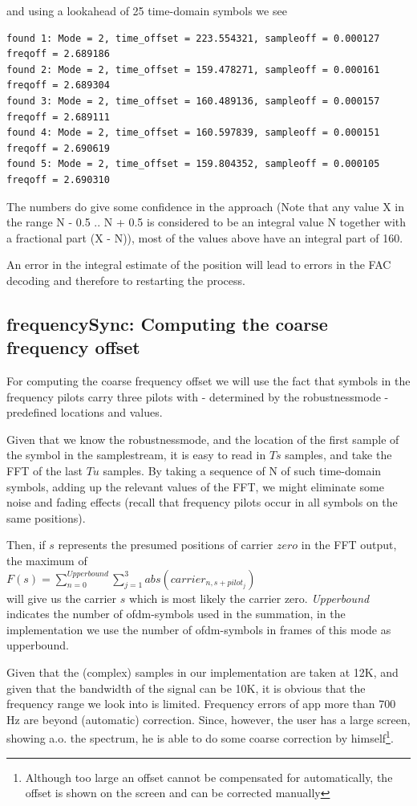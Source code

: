 \documentclass[11pt]{article}
\begin{document}
and using a lookahead of  25 time-domain symbols we see
{\small
\begin{verbatim}
found 1: Mode = 2, time_offset = 223.554321, sampleoff = 0.000127 freqoff = 2.689186
found 2: Mode = 2, time_offset = 159.478271, sampleoff = 0.000161 freqoff = 2.689304
found 3: Mode = 2, time_offset = 160.489136, sampleoff = 0.000157 freqoff = 2.689111
found 4: Mode = 2, time_offset = 160.597839, sampleoff = 0.000151 freqoff = 2.690619
found 5: Mode = 2, time_offset = 159.804352, sampleoff = 0.000105 freqoff = 2.690310
\end{verbatim}
}

The numbers do give some confidence in the approach (Note that
any value  X in the range N - 0.5 .. N + 0.5 is considered to
be an integral value N together with a fractional part (X - N)),
most of the values above have an integral part of 160.

An error in the integral estimate of the position will lead
to errors in the FAC decoding and therefore to restarting the process.

\subsection{frequencySync: Computing the coarse frequency offset}
For computing the coarse frequency offset we will use the fact that 
symbols in the frequency pilots carry three pilots with - 
determined by the robustnessmode  -
predefined locations and values.

Given that we know the robustnessmode, and the location
of the first sample of the symbol
in the samplestream, it is easy to read in $Ts$ samples, and take the
FFT of the last $Tu$ samples. By taking a sequence of N of such time-domain
symbols,
adding up the relevant values of the FFT,
we might eliminate some noise and fading effects (recall that frequency pilots
occur in all symbols on the same positions).

Then, if $s$ represents the presumed
positions of carrier $zero$ in the FFT output, the maximum of
{
\ \\
$F (s) = \sum_{n=0}^{Upperbound} \sum_{j=1}^{3} abs (carrier_{n, s + pilot_j}) $
\ \\
}
will give us the carrier $s$ which is most likely the carrier zero. 
{\em Upperbound} indicates the number of ofdm-symbols 
used in the summation, in the implementation we use the number of
ofdm-symbols in frames of this mode as upperbound.

Given that the (complex) samples in our implementation are taken at 12K,
and given that the bandwidth of the signal can be 10K, it is obvious that
the frequency range we look into is limited. Frequency errors of app
more than 700 Hz are beyond (automatic) correction. Since, however,
the user has a large screen, showing a.o. the spectrum, he is able
to do some coarse correction by himself\footnote{Although too large an offset
cannot be compensated for automatically, the offset is shown on the screen
and can be corrected manually}.
\end{document}

